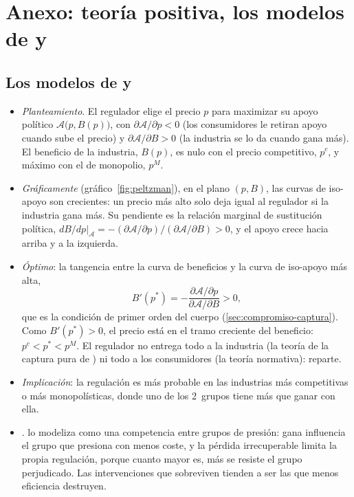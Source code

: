 \documentclass[11pt]{article}
\begin{document}
\section{Anexo: teoría positiva,\cortetitulo{} los modelos de  y }\label{anexo:peltzman}

\subsection{Los modelos de  y }\label{anexo:peltzman-becker}

\begin{itemize}
\item \emph{Planteamiento}. El regulador elige el precio $p$ para maximizar su apoyo político $\mathcal{A}\big(p,B(p)\big)$, con $\partial\mathcal{A}/\partial p<0$ (los consumidores le retiran apoyo cuando sube el precio) y $\partial\mathcal{A}/\partial B>0$ (la industria se lo da cuando gana más)\nocite{Peltzman1976Toward}. El beneficio de la industria, $B(p)$, es nulo con el precio competitivo, $p^c$, y máximo con el de monopolio, $p^M$.
\item \emph{Gráficamente} (gráfico~\ref{fig:peltzman}), en el plano $(p,B)$, las curvas de iso-apoyo son crecientes: un precio más alto solo deja igual al regulador si la industria gana más. Su pendiente es la relación marginal de sustitución política, $\left.dB/dp\right|_{\mathcal{A}}=-(\partial\mathcal{A}/\partial p)/(\partial\mathcal{A}/\partial B)>0$, y el apoyo crece hacia arriba y a la izquierda.
\item \emph{Óptimo}: la tangencia entre la curva de beneficios y la curva de iso-apoyo más alta,
  \[
  B'(p^{*})=-\frac{\partial\mathcal{A}/\partial p}{\partial\mathcal{A}/\partial B}>0,
  \]
  que es la condición de primer orden del cuerpo (\ref{sec:compromiso-captura}). Como $B'(p^{*})>0$, el precio está en el tramo creciente del beneficio: $p^c<p^{*}<p^M$. El regulador no entrega todo a la industria (la teoría de la captura pura de ) ni todo a los consumidores (la teoría normativa): reparte.
\item \emph{Implicación}: la regulación es más probable en las industrias más competitivas o más monopolísticas, donde uno de los 2~grupos tiene más que ganar con ella\nocite{Peltzman1976Toward}.\findemo
\item \emph{}. \textcite{Becker1983Theory} lo modeliza como una competencia entre grupos de presión: gana influencia el grupo que presiona con menos coste, y la pérdida irrecuperable limita la propia regulación, porque cuanto mayor es, más se resiste el grupo perjudicado. Las intervenciones que sobreviven tienden a ser las que menos eficiencia destruyen.
\end{itemize}
\end{document}
